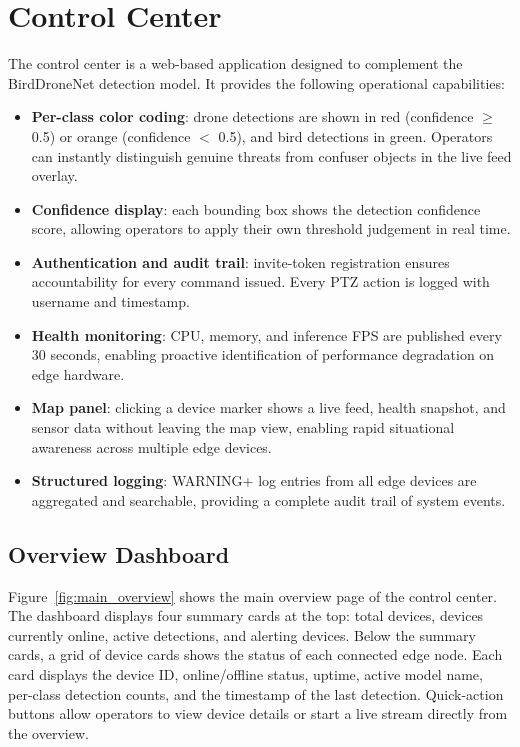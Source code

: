\documentclass[12pt,a4paper]{report}
\begin{document}
\section{Control Center}

The control center is a web-based application designed to complement the
BirdDroneNet detection model. It provides the following operational
capabilities:

\begin{itemize}
  \item \textbf{Per-class color coding}: drone detections are shown in red
        (confidence $\geq$ 0.5) or orange (confidence $<$ 0.5), and bird
        detections in green. Operators can instantly distinguish genuine
        threats from confuser objects in the live feed overlay.
  \item \textbf{Confidence display}: each bounding box shows the detection
        confidence score, allowing operators to apply their own threshold
        judgement in real time.
  \item \textbf{Authentication and audit trail}: invite-token registration
        ensures accountability for every command issued. Every PTZ action
        is logged with username and timestamp.
  \item \textbf{Health monitoring}: CPU, memory, and inference FPS are
        published every 30 seconds, enabling proactive identification of
        performance degradation on edge hardware.
  \item \textbf{Map panel}: clicking a device marker shows a live feed,
        health snapshot, and sensor data without leaving the map view,
        enabling rapid situational awareness across multiple edge devices.
  \item \textbf{Structured logging}: WARNING+ log entries from all edge
        devices are aggregated and searchable, providing a complete audit
        trail of system events.
\end{itemize}

\subsection{Overview Dashboard}

Figure~\ref{fig:main_overview} shows the main overview page of the control
center. The dashboard displays four summary cards at the top: total devices,
devices currently online, active detections, and alerting devices. Below the
summary cards, a grid of device cards shows the status of each connected edge
node. Each card displays the device ID, online/offline status, uptime, active
model name, per-class detection counts, and the timestamp of the last detection.
Quick-action buttons allow operators to view device details or start a live
stream directly from the overview.
\end{document}
